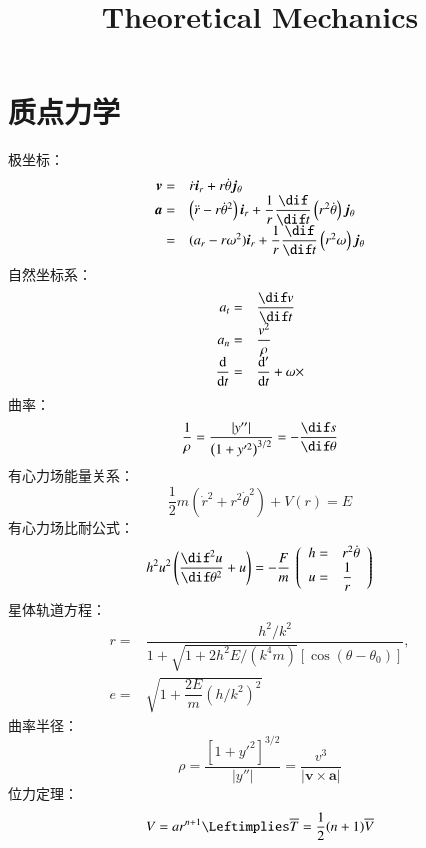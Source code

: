 \documentclass[UTF8,9pt]{ctexart}
\title{Theoretical Mechanics}
\begin{document}
    \maketitle

    \section{质点力学}
        极坐标：
        $$
        \begin{array}{rl}
            \bm{v}=&\dot{r}\bm{i}_{r}+r\dot{\theta}\bm{j}_{\theta}   \\
            \bm{a}=&\left(\ddot{r}-r\dot{\theta}^2\right)\bm{i}_{r}+\dfrac{1}{r}\dfrac{\dif}{\dif t}\left(r^2\dot{\theta}\right)\bm{j}_{\theta}\\
            =&(a_r-r\omega^2)\bm{i}_r+\dfrac{1}{r}\dfrac{\dif}{\dif t}\left(r^2\omega\right)\bm{j}_{\theta}
        \end{array}
        $$ 
        自然坐标系：
        $$
        \begin{array}{rl} 
            a_t=&\dfrac{\dif v}{\dif t}  \\
            a_n=&\dfrac{v^2}{\rho}       \\
            \dfrac{\mathrm{d}}{\mathrm{d}t}=&\dfrac{\mathrm{d}'}{\mathrm{d}t}+\omega\times 
        \end{array}
        $$
        曲率：
        $$\dfrac{1}{\rho}=\dfrac{|y''|}{\left(1+y'^2\right)^{3/2}}=-\dfrac{\dif s}{\dif \theta}$$
        有心力场能量关系：
        $$\dfrac{1}{2}m\left(\dot{r}^2+r^2\dot{\theta}^2\right)+V(r)=E$$
        有心力场比耐公式：
        $$h^2u^2\left(\dfrac{\dif^2u}{\dif \theta^2}+u\right)=-\dfrac{F}{m}\ \left( \begin{array}{ll}
            h=&r^2\dot{\theta}\\
            u=&\dfrac{1}{r}
        \end{array}\right) $$
        星体轨道方程：
        $$\begin{array}{rl}
            r=&\dfrac{h^2/k^2}{1+\sqrt{1+2h^2E/(k^4m)}\left[\cos(\theta-\theta_0)\right]}, \\
            e=&\sqrt{1+\dfrac{2E}{m}(h/k^2)^2}
        \end{array}$$
        曲率半径：
        $$\rho=\dfrac{\left[1+y'^2\right]^{3/2}}{|y''|}=\frac{v^3}{|\bm{v}\times\bm{a}|}$$
        位力定理：
        $$V=ar^{n+1} \Leftimplies \bar{T}=\frac{1}{2}(n+1)\bar{V}$$
\end{document}
